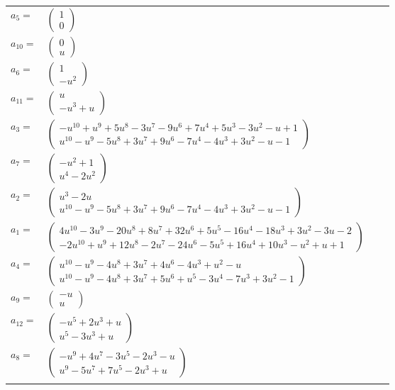\documentclass[1p]{elsarticle_modified}
\theoremstyle{definition}
\begin{document}
\begin{tabular}{m{7pt} m{180pt} m{7pt} m{180pt} }
\flushright $a_{5}=$&$\begin{pmatrix}1\\0\end{pmatrix}$ \\
\flushright $a_{10}=$&$\begin{pmatrix}0\\u\end{pmatrix}$ \\
\flushright $a_{6}=$&$\begin{pmatrix}1\\- u^2\end{pmatrix}$ \\
\flushright $a_{11}=$&$\begin{pmatrix}u\\- u^3+u\end{pmatrix}$ \\
\flushright $a_{3}=$&$\begin{pmatrix}- u^{10}+u^9+5 u^8-3 u^7-9 u^6+7 u^4+5 u^3-3 u^2- u+1\\u^{10}- u^9-5 u^8+3 u^7+9 u^6-7 u^4-4 u^3+3 u^2- u-1\end{pmatrix}$ \\
\flushright $a_{7}=$&$\begin{pmatrix}- u^2+1\\u^4-2 u^2\end{pmatrix}$ \\
\flushright $a_{2}=$&$\begin{pmatrix}u^3-2 u\\u^{10}- u^9-5 u^8+3 u^7+9 u^6-7 u^4-4 u^3+3 u^2- u-1\end{pmatrix}$ \\
\flushright $a_{1}=$&$\begin{pmatrix}4 u^{10}-3 u^9-20 u^8+8 u^7+32 u^6+5 u^5-16 u^4-18 u^3+3 u^2-3 u-2\\-2 u^{10}+u^9+12 u^8-2 u^7-24 u^6-5 u^5+16 u^4+10 u^3- u^2+u+1\end{pmatrix}$ \\
\flushright $a_{4}=$&$\begin{pmatrix}u^{10}- u^9-4 u^8+3 u^7+4 u^6-4 u^3+u^2- u\\u^{10}- u^9-4 u^8+3 u^7+5 u^6+u^5-3 u^4-7 u^3+3 u^2-1\end{pmatrix}$ \\
\flushright $a_{9}=$&$\begin{pmatrix}- u\\u\end{pmatrix}$ \\
\flushright $a_{12}=$&$\begin{pmatrix}- u^5+2 u^3+u\\u^5-3 u^3+u\end{pmatrix}$ \\
\flushright $a_{8}=$&$\begin{pmatrix}- u^9+4 u^7-3 u^5-2 u^3- u\\u^9-5 u^7+7 u^5-2 u^3+u\end{pmatrix}$\\&\end{tabular}
\end{document}

